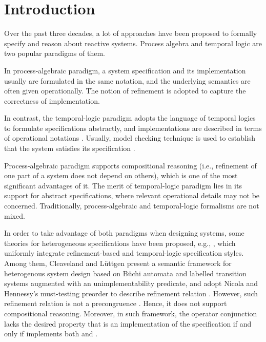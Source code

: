 \documentclass{elsarticle}
\theoremstyle{plain}
\theoremstyle{definition}
\begin{document}
\section{Introduction}

    Over the past three decades, a lot of approaches have been proposed to formally specify and reason about reactive systems. Process algebra \cite{Handbook} and temporal logic \cite{Pnueli} are two popular paradigms of them.

    In process-algebraic paradigm, a system specification and its implementation usually are formulated in the same notation, and the underlying semantics are often given operationally.
    The notion of refinement is adopted to capture the correctness of implementation.

    In contrast, the temporal-logic paradigm adopts the language of temporal logics to formulate specifications abstractly, and implementations are described in terms of operational notations \cite{Pnueli}.
    Usually, model checking technique is used to establish that the system satisfies its specification \cite{ModelChecking}.

    Process-algebraic paradigm supports compositional reasoning (i.e., refinement of one part of a system does not depend on others), which is one of the most significant advantages of it.
    The merit of temporal-logic paradigm lies in its support for  abstract specifications, where relevant operational details may not be concerned.
    Traditionally, process-algebraic and temporal-logic formalisms are not mixed.

    In order to take advantage of both paradigms when designing systems, some theories for heterogeneous specifications have been proposed, e.g., \cite{Cleaveland00, Cleaveland02, Graf86,Kurshan94,Olderog}, which uniformly integrate refinement-based and temporal-logic specification styles.
    Among them,  Cleaveland and L{\"u}ttgen present a semantic framework for heterogenous system design based on B{\"u}chi automata and labelled transition systems augmented with an unimplementability predicate, and adopt Nicola and Hennessy's must-testing preorder \cite{Nicola83} to describe refinement relation \cite{Cleaveland00, Cleaveland02}.
    However, such refinement relation is not a precongruence \cite{Cleaveland00}.
    Hence, it does not support compositional reasoning.
    Moreover, in such framework, the operator conjunction lacks the desired property that  is an implementation of the specification  if and only if  implements both  and  \cite{Cleaveland02}.
\end{document}
